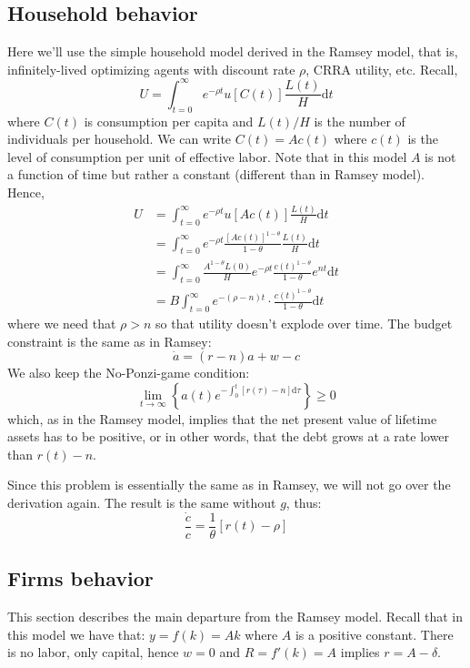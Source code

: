 \documentclass[12pt]{report}
\def\D{\mathrm{d}}
\begin{document}
\subsection{Household behavior}

Here we'll use the simple household model derived in the Ramsey model, that is, infinitely-lived optimizing agents with discount rate $\rho$, CRRA utility, etc. Recall, $$U = \int_{t=0}^{\infty} e^{-\rho t} u[C(t)]\frac{L(t)}{H}\D t $$ where $C(t)$ is consumption per capita and $L(t)/H$ is the number of individuals per household. We can write $C(t) = Ac(t)$ where $c(t)$ is the level of consumption per unit of effective labor. Note that in this model $A$ is not a function of time but rather a constant (different than in Ramsey model). Hence, \begin{align*} U & = \int_{t=0}^{\infty} e^{-\rho t} u[Ac(t)]\frac{L(t)}{H}\D t \\
& = \int_{t=0}^{\infty} e^{-\rho t} \frac{[Ac(t)]^{1-\theta}}{1 - \theta}\frac{L(t)}{H}\D t \\
& = \int_{t=0}^{\infty} \frac{A^{1-\theta}L(0)}{H} e^{-\rho t} \frac{c(t)^{1-\theta}}{1 - \theta}e^{nt}\D t \\
& = B\int_{t=0}^{\infty}  e^{-(\rho - n) t} \cdot \frac{c(t)^{1-\theta}}{1 - \theta}\D t 
\end{align*} where we need that $\rho > n$ so that utility doesn't explode over time. The budget constraint is the same as in Ramsey: $$\dot{a} = (r - n)a + w - c$$ We also keep the No-Ponzi-game condition: $$\lim_{t\to\infty}\left\lbrace a(t)e^{-\int_0^t [r(\tau) - n]\D\tau}\right\rbrace \geq 0 $$ which, as in the Ramsey model, implies that the net present value of lifetime assets has to be positive, or in other words, that the debt grows at a rate lower than $r(t) - n$.

Since this problem is essentially the same as in Ramsey, we will not go over the derivation again. The result is the same without $g$, thus: $$\frac{\dot c}{c} = \frac{1}{\theta} [r(t) - \rho] $$

\subsection{Firms behavior}

This section describes the main departure from the Ramsey model. Recall that in this model we have that: $y = f(k) = Ak$ where $A$ is a positive constant. There is no labor, only capital, hence $w = 0$ and $R = f'(k) = A$ implies $r = A - \delta$.
\end{document}
